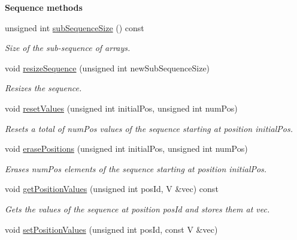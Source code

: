 \begin{Indent}{\bf Sequence methods}\par
\begin{DoxyCompactItemize}
\item 
unsigned int \hyperlink{class_q_u_e_s_o_1_1_array_of_sequences_a007d00d2398007b9bac82ed23eedb1e2}{sub\-Sequence\-Size} () const 
\begin{DoxyCompactList}\small\item\em Size of the sub-\/sequence of arrays. \end{DoxyCompactList}\item 
void \hyperlink{class_q_u_e_s_o_1_1_array_of_sequences_a3067aa6afb3a4fd6f30dc753bbceaf9e}{resize\-Sequence} (unsigned int new\-Sub\-Sequence\-Size)
\begin{DoxyCompactList}\small\item\em Resizes the sequence. \end{DoxyCompactList}\item 
void \hyperlink{class_q_u_e_s_o_1_1_array_of_sequences_a9267060ca0e57a124d9f8ba64e60027c}{reset\-Values} (unsigned int initial\-Pos, unsigned int num\-Pos)
\begin{DoxyCompactList}\small\item\em Resets a total of {\ttfamily num\-Pos} values of the sequence starting at position {\ttfamily initial\-Pos}. \end{DoxyCompactList}\item 
void \hyperlink{class_q_u_e_s_o_1_1_array_of_sequences_a81f3ee91830b977945fa152901d4cd8e}{erase\-Positions} (unsigned int initial\-Pos, unsigned int num\-Pos)
\begin{DoxyCompactList}\small\item\em Erases {\ttfamily num\-Pos} elements of the sequence starting at position {\ttfamily initial\-Pos}. \end{DoxyCompactList}\item 
void \hyperlink{class_q_u_e_s_o_1_1_array_of_sequences_ae75a2eedab5e8d3fc0638f578eba35ab}{get\-Position\-Values} (unsigned int pos\-Id, V \&vec) const 
\begin{DoxyCompactList}\small\item\em Gets the values of the sequence at position {\ttfamily pos\-Id} and stores them at {\ttfamily vec}. \end{DoxyCompactList}\item 
void \hyperlink{class_q_u_e_s_o_1_1_array_of_sequences_a20e1732527bc5c466abf79b827407d54}{set\-Position\-Values} (unsigned int pos\-Id, const V \&vec)

\end{DoxyCompactItemize}
\end{Indent}
